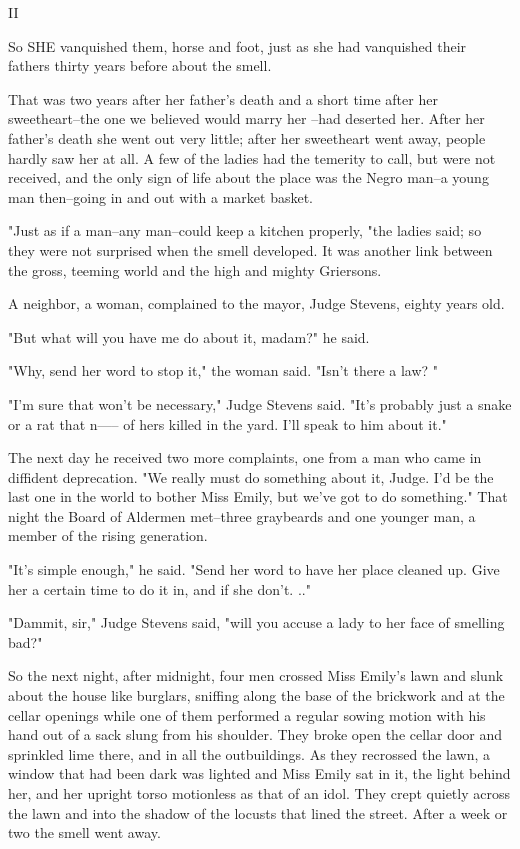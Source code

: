 \documentclass[10pt,a4paper]{article}
\begin{document}
II

So SHE vanquished them, horse and foot, just as she had vanquished their fathers thirty years before about the smell.

That was two years after her father's death and a short time after her sweetheart--the one we believed would marry her --had deserted her. After her father's death she went out very little; after her sweetheart went away, people hardly saw her at all. A few of the ladies had the temerity to call, but were not received, and the only sign of life about the place was the Negro man--a young man then--going in and out with a market basket.

"Just as if a man--any man--could keep a kitchen properly, "the ladies said; so they were not surprised when the smell developed. It was another link between the gross, teeming world and the high and mighty Griersons.

A neighbor, a woman, complained to the mayor, Judge Stevens, eighty years old.

"But what will you have me do about it, madam?" he said.

"Why, send her word to stop it," the woman said. "Isn't there a law? "

"I'm sure that won't be necessary," Judge Stevens said. "It's probably just a snake or a rat that n----- of hers killed in the yard. I'll speak to him about it."

The next day he received two more complaints, one from a man who came in diffident deprecation. "We really must do something about it, Judge. I'd be the last one in the world to bother Miss Emily, but we've got to do something." That night the Board of Aldermen met--three graybeards and one younger man, a member of the rising generation.

"It's simple enough," he said. "Send her word to have her place cleaned up. Give her a certain time to do it in, and if she don't. .."

"Dammit, sir," Judge Stevens said, "will you accuse a lady to her face of smelling bad?"

So the next night, after midnight, four men crossed Miss Emily's lawn and slunk about the house like burglars, sniffing along the base of the brickwork and at the cellar openings while one of them performed a regular sowing motion with his hand out of a sack slung from his shoulder. They broke open the cellar door and sprinkled lime there, and in all the outbuildings. As they recrossed the lawn, a window that had been dark was lighted and Miss Emily sat in it, the light behind her, and her upright torso motionless as that of an idol. They crept quietly across the lawn and into the shadow of the locusts that lined the street. After a week or two the smell went away.
\end{document}
